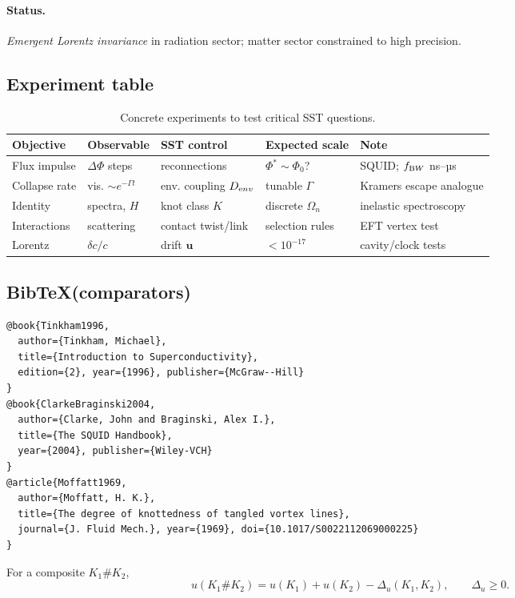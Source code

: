 \documentclass[11pt]{article}
\begin{document}
\paragraph{Status.} \emph{Emergent Lorentz invariance} in radiation sector; matter sector constrained to high precision.

\subsection*{Experiment table}

\begin{table}[H]
\centering
\caption{Concrete experiments to test critical SST questions.}
\begin{tabular}{lllll}
\toprule
Objective & Observable & SST control & Expected scale & Note \\
\midrule
Flux impulse & $\Delta\Phi$ steps & reconnections & $\Phi^*\sim\Phi_0$? & SQUID; $f_{\textrm BW}$ ns--µs \\
Collapse rate & vis. $\sim e^{-\Gamma t}$ & env. coupling $D_{\textrm env}$ & tunable $\Gamma$ & Kramers escape analogue \\
Identity & spectra, $H$ & knot class $K$ & discrete $\Omega_n$ & inelastic spectroscopy \\
Interactions & scattering & contact twist/link & selection rules & EFT vertex test \\
Lorentz & $\delta c/c$ & drift $\mathbf u$ & $<10^{-17}$ & cavity/clock tests \\
\bottomrule
\end{tabular}
\end{table}

\subsection*{Bib\TeX (comparators)}
\begin{verbatim}
@book{Tinkham1996,
  author={Tinkham, Michael},
  title={Introduction to Superconductivity},
  edition={2}, year={1996}, publisher={McGraw--Hill}
}
@book{ClarkeBraginski2004,
  author={Clarke, John and Braginski, Alex I.},
  title={The SQUID Handbook},
  year={2004}, publisher={Wiley-VCH}
}
@article{Moffatt1969,
  author={Moffatt, H. K.},
  title={The degree of knottedness of tangled vortex lines},
  journal={J. Fluid Mech.}, year={1969}, doi={10.1017/S0022112069000225}
}
\end{verbatim}


For a composite $K_1 \# K_2$,
\[
    u(K_1 \# K_2)
    = u(K_1) + u(K_2) - \Delta_u(K_1,K_2),
    \qquad \Delta_u \ge 0.
\]
\end{document}
